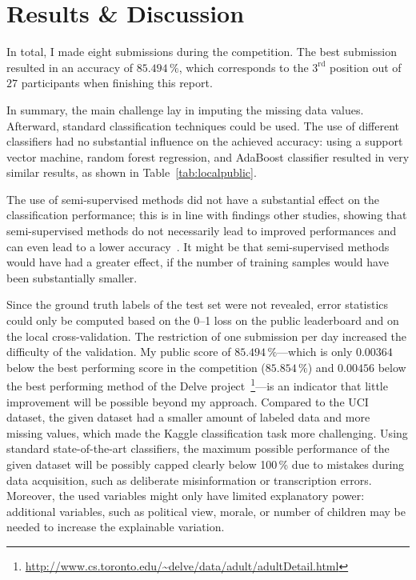 \documentclass[a4paper]{article}
\begin{document}
\section{Results \& Discussion}
\label{sec:results}

In total, I made eight submissions during the competition. The best
submission resulted in an accuracy of $85.494\,\%$, which corresponds
to the $3^{\text{rd}}$ position out of $27$ participants when
finishing this report.

In summary, the main challenge lay in imputing the missing data
values. Afterward, standard classification techniques could be
used. The use of different classifiers had no substantial influence on
the achieved accuracy: using a support vector machine, random forest
regression, and AdaBoost classifier resulted in very similar results,
as shown in Table~\ref{tab:localpublic}.


The use of
semi-supervised methods did not have a substantial effect on the
classification performance; this is in line with findings other
studies, showing that semi-supervised methods do not necessarily lead
to improved performances and can even lead to a lower
accuracy~\cite{zhu2005semi}. It might be that semi-supervised methods
would have had a greater effect, if the number of training samples
would have been substantially smaller.

Since the ground truth labels of the test set were not revealed, error
statistics could only be computed based on the 0--1 loss on the public
leaderboard and on the local cross-validation. The restriction of one
submission per day increased the difficulty of the validation. My
public score of $85.494\,\%$---which is only $0.00364$ below the best
performing score in the competition ($85.854\,\%$) and $0.00456$ below
the best performing method of the Delve
project~\footnote{\url{http://www.cs.toronto.edu/~delve/data/adult/adultDetail.html}}---is
an indicator that little improvement will be possible beyond my
approach. Compared to the UCI dataset, the given dataset had a smaller
amount of labeled data and more missing values, which made the Kaggle
classification task more challenging. Using standard state-of-the-art
classifiers, the maximum possible performance of the given dataset
will be possibly capped clearly below 100\,\% due to mistakes during
data acquisition, such as deliberate misinformation or transcription
errors. Moreover, the used variables might only have limited
explanatory power: additional variables, such as political view,
morale, or number of children may be needed to increase the
explainable variation.
\end{document}
